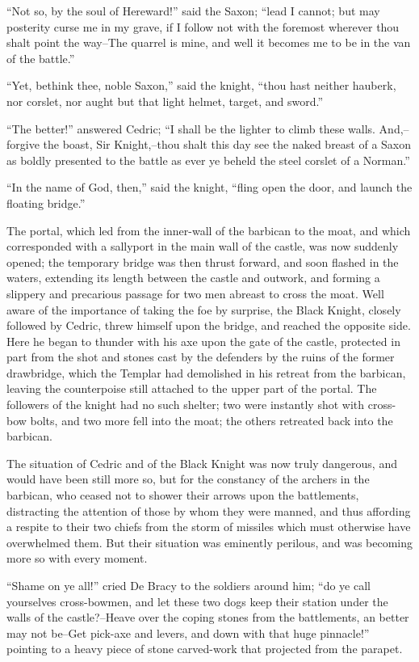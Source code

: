 ``Not so, by the soul of Hereward!'' said the Saxon; ``lead I cannot;
but may posterity curse me in my grave, if I follow not with the
foremost wherever thou shalt point the way--The quarrel is mine, and
well it becomes me to be in the van of the battle.''

``Yet, bethink thee, noble Saxon,'' said the knight, ``thou hast neither
hauberk, nor corslet, nor aught but that light helmet, target, and
sword.''

``The better!'' answered Cedric; ``I shall be the lighter to climb these
walls. And,--forgive the boast, Sir Knight,--thou shalt this day see the
naked breast of a Saxon as boldly presented to the battle as ever ye
beheld the steel corslet of a Norman.''

``In the name of God, then,'' said the knight, ``fling open the door,
and launch the floating bridge.''

The portal, which led from the inner-wall of the barbican to the moat,
and which corresponded with a sallyport in the main wall of the castle,
was now suddenly opened; the temporary bridge was then thrust forward,
and soon flashed in the waters, extending its length between the castle
and outwork, and forming a slippery and precarious passage for two men
abreast to cross the moat. Well aware of the importance of taking the
foe by surprise, the Black Knight, closely followed by Cedric, threw
himself upon the bridge, and reached the opposite side. Here he began to
thunder with his axe upon the gate of the castle, protected in part from
the shot and stones cast by the defenders by the ruins of the former
drawbridge, which the Templar had demolished in his retreat from the
barbican, leaving the counterpoise still attached to the upper part of
the portal. The followers of the knight had no such shelter; two were
instantly shot with cross-bow bolts, and two more fell into the moat;
the others retreated back into the barbican.

The situation of Cedric and of the Black Knight was now truly dangerous,
and would have been still more so, but for the constancy of the archers
in the barbican, who ceased not to shower their arrows upon the
battlements, distracting the attention of those by whom they were
manned, and thus affording a respite to their two chiefs from the storm
of missiles which must otherwise have overwhelmed them. But their
situation was eminently perilous, and was becoming more so with every
moment.

``Shame on ye all!'' cried De Bracy to the soldiers around him; ``do ye
call yourselves cross-bowmen, and let these two dogs keep their station
under the walls of the castle?--Heave over the coping stones from the
battlements, an better may not be--Get pick-axe and levers, and down
with that huge pinnacle!'' pointing to a heavy piece of stone
carved-work that projected from the parapet.

